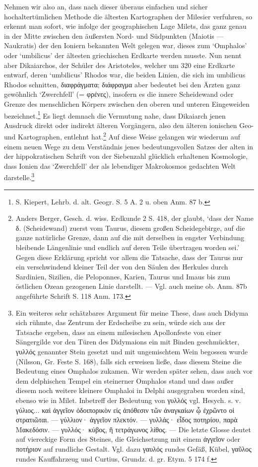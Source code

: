 \documentclass[a4paper, 11pt, oneside]{article}
\begin{document}
Nehmen wir also an, dass nach dieser überaus einfachen und sicher hochaltertümlichen Methode die ältesten Kartographen der Milesier verfuhren, so erkennt man sofort, wie infolge der geographischen Lage Milets, das ganz genau in der Mitte zwischen den äußersten Nord- und Südpunkten (Maiotis --- Naukratis) der den Ioniern bekannten Welt gelegen war, dieses zum `Omphalos' oder `umbilicus' der ältesten griechischen Erdkarte werden musste. Nun nennt aber Dikaiarchos, der Schüler des Aristoteles, welcher um 320 eine Erdkarte entwarf, deren `umbilicus' Rhodos war, die beiden Linien, die sich im umbilicus Rhodos schnitten, διαφράγματα; διάφραγμα aber bedeutet bei den Ärzten ganz gewöhnlich `Zwerchfell' (= φρένες), insofern es die innere Scheidewand oder Grenze des menschlichen Körpers zwischen den oberen und unteren Eingeweiden bezeichnet.\footnote{S. Kiepert, Lehrb. d. alt. Geogr. S. 5 A. 2 u. oben Anm. 87 b.} Es liegt demnach die Vermutung nahe, dass Dikaiarch jenen Ausdruck direkt oder indirekt älteren Vorgängern, also den älteren ionischen Geo- und Kartographen, entlehnt hat.\footnote{Anders Berger, Gesch. d. wiss. Erdkunde 2 S. 418, der glaubt, `dass der Name δ. (Scheidewand) zuerst vom Taurus, diesem großen Scheidegebirge, auf die ganze natürliche Grenze, dann auf die mit derselben in engster Verbindung bleibende Längenlinie und endlich auf deren Teile übertragen worden sei.' Gegen diese Erklärung spricht vor allem die Tatsache, dass der Taurus nur ein verschwindend kleiner Teil der von den Säulen des Herkules durch Sardinien, Sizilien, die Peloponnes, Karien, Taurus und Imaus bis zum östlichen Ozean gezogenen Linie darstellt. --- Vgl. auch meine ob. Anm. 87b angeführte Schrift S. 118 Anm. 173.} Auf diese Weise gelangen wir wiederum auf einem neuen Wege zu dem Verständnis jenes bedeutungsvollen Satzes der alten in der hippokratischen Schrift von der Siebenzahl glücklich erhaltenen Kosmologie, dass Ionien das `Zwerchfell' der als lebendiger Makrokosmos gedachten Welt darstelle.\footnote{Ein weiteres sehr schätzbares Argument für meine These, dass auch Didyma sich rühmte, das Zentrum der Erdscheibe zu sein, würde sich aus der Tatsache ergeben, dass an einem milesischen Apollonfeste von einer Sängergilde vor den Türen des Didymaions ein mit Binden geschmückter, γυλλός genannter Stein gesetzt und mit ungemischtem Wein begossen wurde (Nilsson, Gr. Feste S. 168), falls sich erweisen ließe, dass diesem Steine die Bedeutung eines Omphalos zukamen. Wir werden später sehen, dass auch vor dem delphischen Tempel ein steinerner Omphalos stand und dass außer diesem noch weitere kleinere Omphaloi in Delphi ausgegraben worden sind, ebenso wie in Milet. Inbetreff der Bedeutung von γυλλός vgl. Hesych. s. v. γύλιος... καὶ ἀγγεῖον ὁδοιπορικὸν εἰς ἀπόθεσιν τῶν ἀναγκαίων ᾧ ἐχρῶντο οἱ στρατιῶται. --- γύλλιον· ἀγγεῖον πλεκτόν. --- γυλλάς· εἶδος ποτηρίου, παρὰ Μακεδόσιν. --- γυλλός· κύβος, ἢ τετράγωνος λίθος. --- Die letzte Glosse deutet auf viereckige Form des Steines, die Gleichsetzung mit einem ἀγγεῖον oder ποτήριον auf rundliche Gestalt. Vgl. dazu γαυλός rundes Gefäß, Kübel, γαῦλος rundes Kauffahrzeug und Curtius, Grundz. d. gr. Etym. 5 174 f.}
\end{document}
